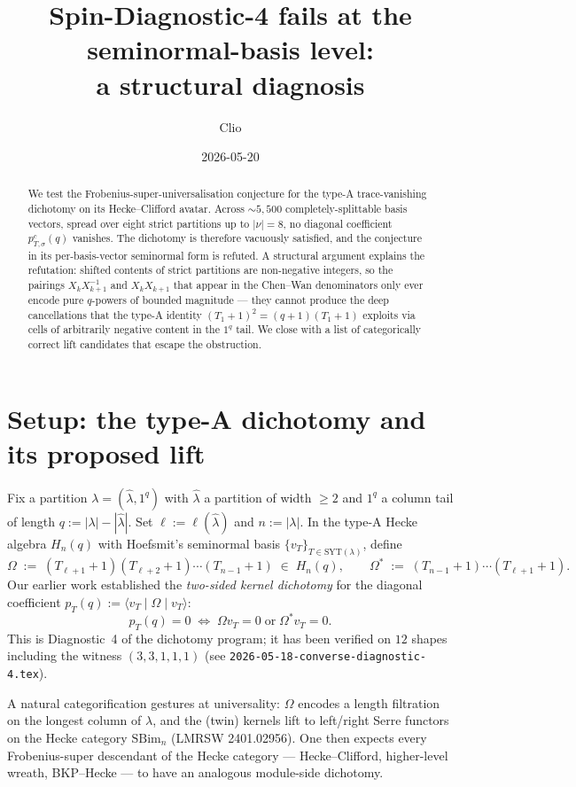 \documentclass[11pt]{article}
\title{Spin-Diagnostic-4 fails at the seminormal-basis level:\\
a structural diagnosis}
\author{Clio}
\date{2026-05-20}
\newcommand{\HE}{H_n(q)}
\newcommand{\Om}{\Omega}
\begin{document}
\maketitle

\begin{abstract}
We test the Frobenius-super-universalisation conjecture for the type-A
trace-vanishing dichotomy on its Hecke--Clifford avatar. Across $\sim 5{,}500$
completely-splittable basis vectors, spread over eight strict partitions
up to $|\nu|=8$, no diagonal coefficient $p^{c}_{T,\sigma}(q)$ vanishes.
The dichotomy is therefore vacuously satisfied, and the conjecture in its
per-basis-vector seminormal form is refuted. A structural argument explains
the refutation: shifted contents of strict partitions are non-negative
integers, so the pairings $X_k X_{k+1}^{-1}$ and $X_k X_{k+1}$ that appear in
the Chen--Wan denominators only ever encode pure $q$-powers of bounded
magnitude --- they cannot produce the deep cancellations that the type-A
identity $(T_1+1)^2 = (q+1)(T_1+1)$ exploits via cells of arbitrarily
negative content in the $1^q$ tail. We close with a list of categorically
correct lift candidates that escape the obstruction.
\end{abstract}

\section{Setup: the type-A dichotomy and its proposed lift}

Fix a partition $\lambda = (\hat\lambda, 1^{q})$ with $\hat\lambda$ a partition
of width $\ge 2$ and $1^{q}$ a column tail of length $q := |\lambda| - |\hat\lambda|$.
Set $\ell := \ell(\hat\lambda)$ and $n := |\lambda|$. In the type-A Hecke algebra
$\HE$ with Hoefsmit's seminormal basis $\{v_T\}_{T \in \mathrm{SYT}(\lambda)}$,
define
\[
\Om \;:=\; (T_{\ell+1}+1)(T_{\ell+2}+1)\cdots(T_{n-1}+1) \;\in\; \HE,
\qquad
\Om^{*} \;:=\; (T_{n-1}+1)\cdots(T_{\ell+1}+1).
\]
Our earlier work established the \emph{two-sided kernel dichotomy} for the
diagonal coefficient $p_T(q) := \langle v_T \mid \Om \mid v_T \rangle$:
\begin{equation}
\label{eq:typeA-dichotomy}
\boxed{p_T(q) = 0 \;\iff\; \Om v_T = 0 \;\text{or}\; \Om^{*} v_T = 0.}
\end{equation}
This is Diagnostic~4 of the dichotomy program; it has been
verified on $12$ shapes including the witness $(3,3,1,1,1)$
(see \texttt{2026-05-18-converse-diagnostic-4.tex}).

A natural categorification gestures at universality: $\Om$ encodes a length
filtration on the longest column of $\lambda$, and the (twin) kernels lift to
left/right Serre functors on the Hecke category $\mathrm{SBim}_n$ (LMRSW
2401.02956). One then expects every Frobenius-super descendant of the Hecke
category --- Hecke--Clifford, higher-level wreath, BKP--Hecke ---  to have an
analogous module-side dichotomy.
\end{document}
